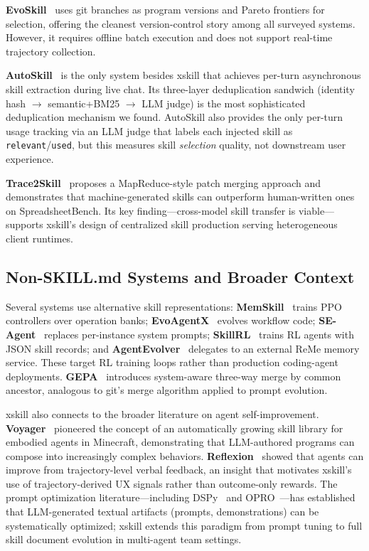 \documentclass{article}
\begin{document}
\textbf{EvoSkill}~\citep{sentient2025evoskill} uses git branches as program versions and Pareto frontiers for selection, offering the cleanest version-control story among all surveyed systems. However, it requires offline batch execution and does not support real-time trajectory collection.

\textbf{AutoSkill}~\citep{ecnu2025autoskill} is the only system besides xskill that achieves per-turn asynchronous skill extraction during live chat. Its three-layer deduplication sandwich (identity hash $\to$ semantic+BM25 $\to$ LLM judge) is the most sophisticated deduplication mechanism we found. AutoSkill also provides the only per-turn usage tracking via an LLM judge that labels each injected skill as \texttt{relevant}/\texttt{used}, but this measures skill \emph{selection} quality, not downstream user experience.

\textbf{Trace2Skill}~\citep{alibaba2025trace2skill} proposes a MapReduce-style patch merging approach and demonstrates that machine-generated skills can outperform human-written ones on SpreadsheetBench. Its key finding---cross-model skill transfer is viable---supports xskill's design of centralized skill production serving heterogeneous client runtimes.

\subsection{Non-SKILL.md Systems and Broader Context}

Several systems use alternative skill representations: \textbf{MemSkill}~\citep{memskill2025} trains PPO controllers over operation banks; \textbf{EvoAgentX}~\citep{evoagentx2025} evolves workflow code; \textbf{SE-Agent}~\citep{seagent2025} replaces per-instance system prompts; \textbf{SkillRL}~\citep{skillrl2025} trains RL agents with JSON skill records; and \textbf{AgentEvolver}~\citep{agentevolver2025} delegates to an external ReMe memory service. These target RL training loops rather than production coding-agent deployments. \textbf{GEPA}~\citep{gepa2025} introduces system-aware three-way merge by common ancestor, analogous to git's merge algorithm applied to prompt evolution.

xskill also connects to the broader literature on agent self-improvement. \textbf{Voyager}~\citep{wang2023voyager} pioneered the concept of an automatically growing skill library for embodied agents in Minecraft, demonstrating that LLM-authored programs can compose into increasingly complex behaviors. \textbf{Reflexion}~\citep{shinn2023reflexion} showed that agents can improve from trajectory-level verbal feedback, an insight that motivates xskill's use of trajectory-derived UX signals rather than outcome-only rewards. The prompt optimization literature---including DSPy~\citep{khattab2023dspy} and OPRO~\citep{yang2024opro}---has established that LLM-generated textual artifacts (prompts, demonstrations) can be systematically optimized; xskill extends this paradigm from prompt tuning to full skill document evolution in multi-agent team settings.
\end{document}

